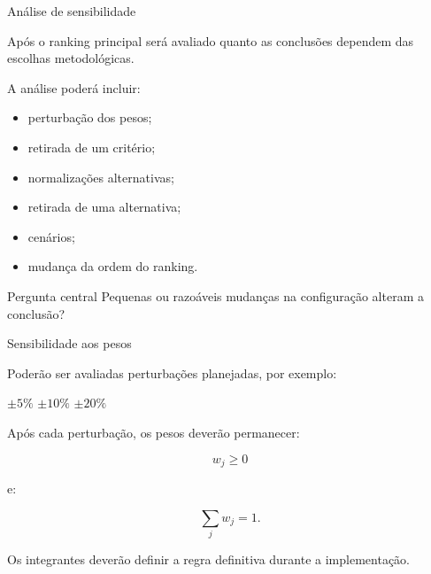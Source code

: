 \begin{frame}{Análise de sensibilidade}

    Após o ranking principal será avaliado quanto as conclusões
    dependem das escolhas metodológicas.

    \vspace{0.3cm}

    A análise poderá incluir:

    \begin{itemize}
        \item perturbação dos pesos;
        \item retirada de um critério;
        \item normalizações alternativas;
        \item retirada de uma alternativa;
        \item cenários;
        \item mudança da ordem do ranking.
    \end{itemize}

    \vspace{0.3cm}

    \begin{block}{Pergunta central}
        Pequenas ou razoáveis mudanças na configuração alteram a
        conclusão?
    \end{block}

\end{frame}



\begin{frame}{Sensibilidade aos pesos}

    Poderão ser avaliadas perturbações planejadas, por exemplo:

    \begin{center}
        \(\pm5\%\)
        \qquad
        \(\pm10\%\)
        \qquad
        \(\pm20\%\)
    \end{center}

    \vspace{0.3cm}

    Após cada perturbação, os pesos deverão permanecer:

    \[
    w_j\geq0
    \]

    e:

    \[
    \sum_j w_j=1.
    \]

    \vspace{0.3cm}

    Os integrantes deverão definir a regra definitiva durante a
    implementação.

\end{frame}


